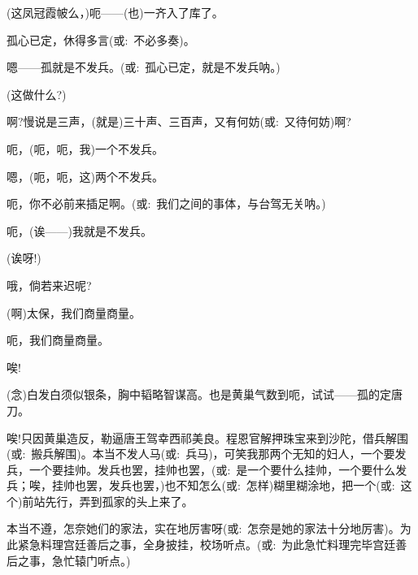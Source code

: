 {(这凤冠霞帔么，)呃------(也)一齐入了库了。

孤心已定，休得多言({\akai 或}:~不必多奏)。

嗯------孤就是不发兵。({\akai 或}:~孤心已定，就是不发兵呐。)

(这做什么?)

啊?慢说是三声，(就是)三十声、三百声，又有何妨({\akai 或}:~又待何妨)啊?

呃，(呃，呃，我)一个不发兵。

嗯，(呃，呃，这)两个不发兵。

呃，你不必前来插足啊。({\akai 或}:~我们之间的事体，与台驾无关呐。)

呃，(诶------)我就是不发兵。

(诶呀!)\hspace{20pt}~

哦，倘若来迟呢?

(啊)太保，我们商量商量。

呃，我们商量商量。

唉!\hspace{40pt}~




\vspace{5pt}

({\akai 念})白发白须似银条，胸中韬略智谋高。也是黄巢气数到呃，试试------孤的定唐刀。

唉!只因黄巢造反，勒逼唐王驾幸西祁美良。程恩官解押珠宝来到沙陀，借兵解围({\akai 或}:~搬兵解围)。本当不发人马({\akai 或}:~兵马)，可笑我那两个无知的妇人，一个要发兵，一个要挂帅。发兵也罢，挂帅也罢，({\akai 或}:~是一个要什么挂帅，一个要什么发兵；唉，挂帅也罢，发兵也罢，)也不知怎么({\akai 或}:~怎样)糊里糊涂地，把一个({\akai 或}:~这个)前站先行，弄到孤家的头上来了。

本当不遵，怎奈她们的家法，实在地厉害呀({\akai 或}:~怎奈是她的家法十分地厉害)。为此紧急料理宫廷善后之事，全身披挂，校场听点。({\akai 或}:~为此急忙料理完毕宫廷善后之事，急忙辕门听点。)

}
